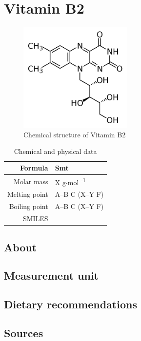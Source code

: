 \documentclass{book}
\begin{document}
\chapter{Vitamin B2}
\begin{figure}[h]
	\caption{Chemical structure of Vitamin B2}
	\centering \includegraphics[width=0.5\textwidth]{images/Vitamin_B2_chemical_structure}
\end{figure}

\begin{table}[h]
	\caption{Chemical and physical data}
	\centering \begin{tabular}{| r | l |}
		\hline
		Formula & Smt\\ \hline
		Molar mass & X g$\cdot$mol \textsuperscript{-1}\\ \hline
		Melting point & A--B \degree C (X--Y \degree F)\\ \hline
		Boiling point & A--B \degree C (X--Y \degree F)\\ \hline
		SMILES & \\ \hline
	\end{tabular}
\end{table}
\newpage

\section{About}


\section{Measurement unit}


\section{Dietary recommendations}


\section{Sources}
\end{document}
